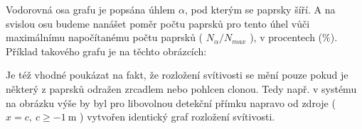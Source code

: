 Vodorovná osa grafu je popsána úhlem $\alpha$, pod kterým se paprsky šíří. A na svislou osu budeme nanášet poměr počtu paprsků pro tento úhel vůči maximálnímu napočítanému počtu paprsků ( $ N_\alpha / N_{max} $ ), v procentech ($\mathrm{\%}$). Příklad takového grafu je na těchto obrázcích:


Je též vhodné poukázat na fakt, že rozložení svítivosti se mění pouze pokud je některý z paprsků odražen zrcadlem nebo pohlcen clonou. Tedy např. v systému na obrázku výše by byl pro libovolnou detekční přímku napravo od zdroje ( $x = c,\ c \geq -1\ \mathrm{m}$ ) vytvořen identický graf rozložení svítivosti.